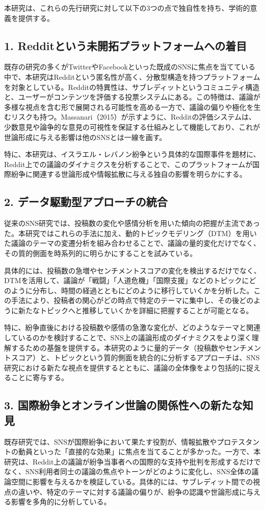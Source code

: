 \documentclass[11pt, a4j]{jreport}
\begin{document}
    本研究は、これらの先行研究に対して以下の3つの点で独自性を持ち、学術的意義を提供する。

    \subsection*{1. Redditという未開拓プラットフォームへの着目}
    既存の研究の多くがTwitterやFacebookといった既成のSNSに焦点を当てている中で、本研究はRedditという匿名性が高く、分散型構造を持つプラットフォームを対象としている。Redditの特異性は、サブレディットというコミュニティ構造と、ユーザーがコンテンツを評価する投票システムにある。この特徴は、議論が多様な視点を含む形で展開される可能性を高める一方で、議論の偏りや極化を生むリスクも持つ。Massanari（2015）が示すように、Redditの評価システムは、少数意見や論争的な意見の可視性を保証する仕組みとして機能しており、これが世論形成に与える影響は他のSNSとは一線を画す。

    特に、本研究は、イスラエル・レバノン紛争という具体的な国際事件を題材に、Reddit上での議論のダイナミクスを分析することで、このプラットフォームが国際紛争に関連する世論形成や情報拡散に与える独自の影響を明らかにする。

    \subsection*{2. データ駆動型アプローチの統合}
    従来のSNS研究では、投稿数の変化や感情分析を用いた傾向の把握が主流であった。本研究ではこれらの手法に加え、動的トピックモデリング（DTM）を用いた議論のテーマの変遷分析を組み合わせることで、議論の量的変化だけでなく、その質的側面を時系列的に明らかにすることを試みている。

    具体的には、投稿数の急増やセンチメントスコアの変化を検出するだけでなく、DTMを活用して、議論が「戦闘」「人道危機」「国際支援」などのトピックにどのように分布し、時間の経過とともにどのように移行していくかを分析した。この手法により、投稿者の関心がどの時点で特定のテーマに集中し、その後どのように新たなトピックへと推移していくかを詳細に把握することが可能となる。

    特に、紛争直後における投稿数や感情の急激な変化が、どのようなテーマと関連しているのかを検討することで、SNS上の議論形成のダイナミクスをより深く理解するための基盤を提供する。本研究のように量的データ（投稿数やセンチメントスコア）と、トピックという質的側面を統合的に分析するアプローチは、SNS研究における新たな視点を提供するとともに、議論の全体像をより包括的に捉えることに寄与する。

    \subsection*{3. 国際紛争とオンライン世論の関係性への新たな知見}
    既存研究では、SNSが国際紛争において果たす役割が、情報拡散やプロテスタントの動員といった「直接的な効果」に焦点を当てることが多かった。一方で、本研究は、Reddit上の議論が紛争当事者への国際的な支持や批判を形成するだけでなく、SNS利用者同士の議論の焦点やトーンがどのように変化し、SNS全体の議論空間に影響を与えるかを検証している。具体的には、サブレディット間での視点の違いや、特定のテーマに対する議論の偏りが、紛争の認識や世論形成に与える影響を多角的に分析している。
\end{document}
